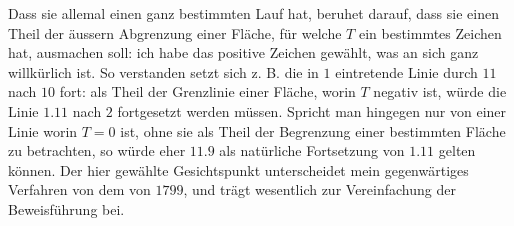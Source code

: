 \expandafter\def\csname HistoricalNoteText15\endcsname{Dass sie allemal einen ganz bestimmten Lauf hat, beruhet darauf, dass sie einen Theil der äussern
Abgrenzung einer Fläche, für welche $T$ ein bestimmtes Zeichen hat, ausmachen soll: ich habe das positive
Zeichen gewählt, was an sich ganz willkürlich ist. So verstanden setzt sich z. B. die in $1$ eintretende Linie
durch $11$ nach $10$ fort: als Theil der Grenzlinie einer Fläche, worin $T$ negativ ist, würde die Linie $1.11$
nach $2$ fortgesetzt werden müssen. Spricht man hingegen nur von einer Linie worin $T=0$ ist, ohne sie als
Theil der Begrenzung einer bestimmten Fläche zu betrachten, so würde eher $11.9$ als natürliche Fortsetzung
von $1.11$ gelten können. Der hier gewählte Gesichtspunkt unterscheidet mein gegenwärtiges Verfahren von
dem von $1799$, und trägt wesentlich zur Vereinfachung der Beweisführung bei.}
